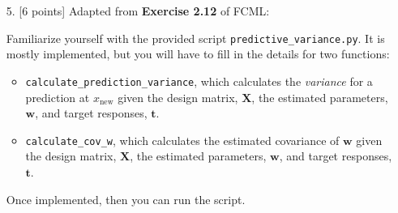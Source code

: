 \documentclass[10pt]{article}
\begin{document}
\begin{itemize}
{\bf Solution.} 

A Bernoulli is concerned with a particular sequence, so "HHTHH" which produces an outcome of one T.

A Binomial considers all the possibilities of getting a particular outcome (e.g., one T): THHHH, HHHHT.

If each sample is independent, then we're not thinking about all the different ways we could have gotten each particular sequence and therefore all the combinations of sequences that would produce the end results

\begin{eqnarray*}
\begin{aligned}
P(X = x) &= q^x(1-q)^{1-x}
\\
\mathcal{L} &= \prod_n^N q^{x_n}(1-q)^{1-{x_n}}
\\
\log\mathcal{L} &= \sum_n^N \log \left( q^{x_n} (1-q)^{1-{x_n}} \right)
\\
&= \sum_n^N  x_n \log q + \sum_n^N \log (1-q)^{1-{x_n}}
\\
&= \log q \sum_n^N  x_n + \log (1-q)^{\sum_n^N 1-{x_n}}
\\
\frac { \partial \log\mathcal{L}} {\partial q} &= \frac{\sum_n^N x}{q} + \frac{\sum_n^N 1 - x}{1 - q} = 0
\\
\frac{\sum_n^N x}{q} &= - \frac{\sum_n^N 1-x}{1-q}
\\
(1-q)\sum_n^N x &= -q \sum_n^N (1-x)
\\
(1-q)\sum_n^N x &= -q (N - \sum_n^N x)
\\
\sum_n^N x - q \sum_n^N x &= -qN + q \sum_n^N x
\\
\sum_n^N x  &= -qN + 2q \sum_n^N x
\\
\sum_n^N x  &= -q(N - 2 \sum_n^N x)
\\
\frac{\sum_n^N x}{(N - 2 \sum_n^N x)}  &= -q
\\
q &= -\frac{\sum_n^N x}{2 \sum_n^N x - N}
\end{aligned}
\end{eqnarray*}

\item[5.] [6 points]
Adapted from {\bf Exercise 2.12} of FCML:

Familiarize yourself with the provided script {\tt predictive\_variance.py}.  
It is mostly implemented, but you will have to fill in the details for two functions: 
\begin{itemize}
\item {\tt calculate\_prediction\_variance}, which calculates the {\em variance} for a prediction at $x_{\mathrm{new}}$ given the design matrix, $\mathbf{X}$, the estimated parameters, $\mathbf{w}$, and target responses, $\mathbf{t}$.
\item {\tt calculate\_cov\_w}, which calculates the estimated covariance of $\mathbf{w}$ given the design matrix, $\mathbf{X}$, the estimated parameters, $\mathbf{w}$, and target responses, $\mathbf{t}$.
\end{itemize}
Once implemented, then you can run the script.


\end{itemize}
\end{document}
